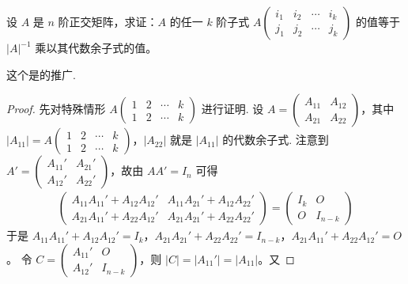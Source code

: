 \documentclass[../../main.tex]{subfiles}%
\begin{document}
\begin{proposition}\label{proposition:例9.45}
设 \(A\) 是 \(n\) 阶正交矩阵，求证：\(A\) 的任一 \(k\) 阶子式 \(A\begin{pmatrix}
i_1 & i_2 & \cdots & i_k \\
j_1 & j_2 & \cdots & j_k
\end{pmatrix}\) 的值等于 \(\vert A\vert^{-1}\) 乘以其代数余子式的值。
\end{proposition}
\begin{remark}
这个是的推广.
\end{remark}
\begin{proof}

先对特殊情形 \(A\begin{pmatrix}
1 & 2 & \cdots & k \\
1 & 2 & \cdots & k
\end{pmatrix}\) 进行证明. 设 \(A = \begin{pmatrix}
A_{11} & A_{12} \\
A_{21} & A_{22}
\end{pmatrix}\)，其中 \(\vert A_{11}\vert = A\begin{pmatrix}
1 & 2 & \cdots & k \\
1 & 2 & \cdots & k
\end{pmatrix}\)，\(\vert A_{22}\vert\) 就是 \(\vert A_{11}\vert\) 的代数余子式. 注意到 \(A' = \begin{pmatrix}
A_{11}' & A_{21}' \\
A_{12}' & A_{22}'
\end{pmatrix}\)，故由 \(AA' = I_n\) 可得
\begin{align*}
\begin{pmatrix}
A_{11}A_{11}' + A_{12}A_{12}' & A_{11}A_{21}' + A_{12}A_{22}' \\
A_{21}A_{11}' + A_{22}A_{12}' & A_{21}A_{21}' + A_{22}A_{22}'
\end{pmatrix} = \begin{pmatrix}
I_k & O \\
O & I_{n - k}
\end{pmatrix}
\end{align*}
于是
\(A_{11}A_{11}' + A_{12}A_{12}' = I_k\)，\(A_{21}A_{21}' + A_{22}A_{22}' = I_{n - k}\)，\(A_{21}A_{11}' + A_{22}A_{12}' = O\)。
令 \(C = \begin{pmatrix}
A_{11}' & O \\
A_{12}' & I_{n - k}
\end{pmatrix}\)，则 \(\vert C\vert = \vert A_{11}'\vert = \vert A_{11}\vert\)。又

\end{proof}
\end{document}
